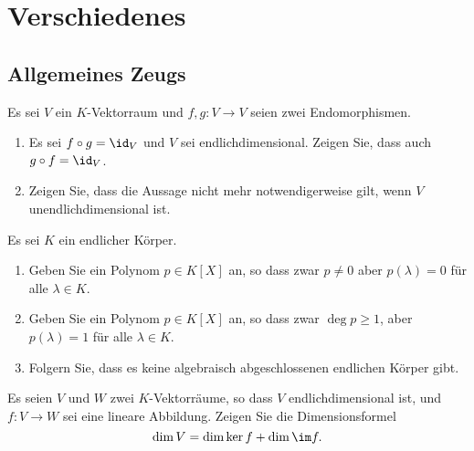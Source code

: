 \section{Verschiedenes}










\subsection{Allgemeines Zeugs}


\begin{question}
  Es sei $V$ ein $K$-Vektorraum und $f, g \colon V \to V$ seien zwei Endomorphismen.
  \begin{enumerate}[leftmargin=*]
    \item
      Es sei $f \circ g = \id_V$ und $V$ sei endlichdimensional.
      Zeigen Sie, dass auch $g \circ f = \id_V$.
    \item
      Zeigen Sie, dass die Aussage nicht mehr notwendigerweise gilt, wenn $V$ unendlichdimensional ist.
  \end{enumerate}
\end{question}


\begin{question}
  Es sei $K$ ein endlicher Körper.
  \begin{enumerate}[leftmargin=*]
    \item
      Geben Sie ein Polynom $p \in K[X]$ an, so dass zwar $p \neq 0$ aber $p(\lambda) = 0$ für alle $\lambda \in K$.
    \item
      Geben Sie ein Polynom $p \in K[X]$ an, so dass zwar $\deg p \geq 1$, aber $p(\lambda) = 1$ für alle $\lambda \in K$.
    \item
      Folgern Sie, dass es keine algebraisch abgeschlossenen endlichen Körper gibt.
  \end{enumerate}
\end{question}


\begin{question}
  Es seien $V$ und $W$ zwei $K$-Vektorräume, so dass $V$ endlichdimensional ist, und $f \colon V \to W$ sei eine lineare Abbildung.
  Zeigen Sie die Dimensionsformel
  \[
    \dim V = \dim \ker f + \dim \im f.
  \]
\end{question}


